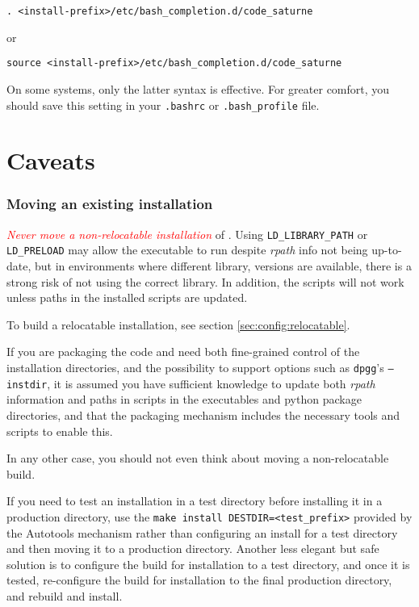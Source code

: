 \documentclass[a4paper,10pt,twoside]{csshortdoc}
\begin{document}
\texttt{. <install-prefix>/etc/bash\_completion.d/code\_saturne}

or

\texttt{source <install-prefix>/etc/bash\_completion.d/code\_saturne}

On some systems, only the latter syntax is effective. For greater
comfort, you should save this setting in your \texttt{.bashrc}
or \texttt{.bash\_profile} file.

\section{Caveats}

\subsubsection{Moving an existing installation}

\textcolor{Red}{\emph{Never move a non-relocatable installation}} of \CS.
Using \texttt{LD\_LIBRARY\_PATH} or \texttt{LD\_PRELOAD}
may allow the executable to run despite \emph{rpath} info
not being up-to-date, but in environments where different library,
versions are available, there is a strong risk of not using
the correct library. In addition, the scripts will not work
unless paths in the installed scripts are updated.

To build a relocatable installation, see section
\ref{sec:config:relocatable}.

If you are packaging the code and need both fine-grained control of
the installation directories, and the possibility to support
options such as \texttt{dpgg}'s \texttt{--instdir}, it is assumed
you have sufficient knowledge to update both \emph{rpath} information
and paths in scripts in the executables and python package directories,
and that the packaging mechanism includes the necessary tools and
scripts to enable this.

In any other case, you should not even think about moving a
non-relocatable build.

If you need to test an installation in a test directory before
installing it in a production directory, use the
\texttt{make install DESTDIR=<test\_prefix>} provided
by the Autotools mechanism rather than configuring an install for a
test directory and then moving it to a production directory.
Another less elegant but safe solution is to configure the build for
installation to a test directory, and once it is tested,
re-configure the build for installation to the final production
directory, and rebuild and install.
\end{document}
